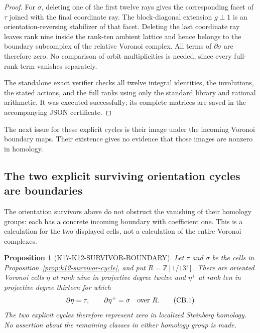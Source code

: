 \documentclass[11pt,a4paper]{article}
\newtheorem{proposition}[theorem]{Proposition}
\theoremstyle{definition}
\begin{document}
\begin{proof}
For $\sigma$, deleting one of the first twelve rays gives the
corresponding facet of $\tau$ joined with the final coordinate ray.
The block-diagonal extension $g\perp1$ is an orientation-reversing
stabilizer of that facet. Deleting the last coordinate ray leaves
rank nine inside the rank-ten ambient lattice and hence belongs to
the boundary subcomplex of the relative Voronoi complex. All terms
of $\partial\sigma$ are therefore zero. No comparison of orbit
multiplicities is needed, since every full-rank term vanishes
separately.

The standalone exact verifier
 checks all twelve
integral identities, the involutions, the stated actions, and the
full ranks using only the standard library and rational arithmetic.
It was executed successfully; its complete matrices are saved in
the accompanying JSON certificate.
\end{proof}

The next issue for these explicit cycles is their image under the
incoming Voronoi boundary maps. Their existence gives no evidence
that those images are nonzero in homology.

\subsection{The two explicit surviving orientation cycles are boundaries}
\label{subsec:k12-survivor-coface}

The orientation survivors above do not obstruct the vanishing of their
homology groups: each has a concrete incoming boundary with coefficient
one.  This is a calculation for the two displayed cells, not a
calculation of the entire Voronoi complexes.

\begin{proposition}[K17-K12-SURVIVOR-BOUNDARY]
\label{prop:k12-survivor-boundary}
Let $\tau$ and $\sigma$ be the cells in
Proposition~\ref{prop:k12-survivor-cycle}, and put
$R=\mathbb Z[1/13!]$. There are oriented Voronoi cells $\eta$ at
rank nine in projective degree twelve and $\eta^+$ at rank ten
in projective degree thirteen for which
\[
             \partial\eta=\tau,\qquad
             \partial\eta^+=\sigma
             \quad\hbox{over }R.                         \tag{CB.1}
\]
The two explicit cycles therefore represent zero in localized
Steinberg homology. No assertion about the remaining classes in
either homology group is made.
\end{proposition}
\end{document}
